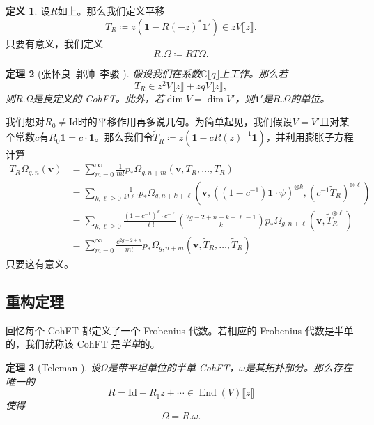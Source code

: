 \documentclass{amsart}
\newtheorem{thm}{定理}[section]
\theoremstyle{definition}
\newtheorem{defn}[thm]{定义}
\theoremstyle{remark}
\theoremstyle{plain}
\theoremstyle{definition}
\theoremstyle{remark}
\newcommand{\C}{\mathbb{C}}
\newcommand{\mbf}[1]{\mathbf{#1}}
\newcommand{\bv}{\mbf{v}}
\newcommand{\mr}[1]{\mathrm{#1}}
\newcommand{\1}{\mathbf{1}}
\newcommand{\2}{\mathbf{2}}
\newcommand{\3}{\mathbf{3}}
\newcommand{\ps}[1]{\llbracket #1 \rrbracket}
\DeclareMathOperator{\End}{End}
\begin{document}
\begin{defn}
    设$R$如上。那么我们定义平移
    \[ T_R \coloneqq z (\1 - R(-z)^* \1') \in z V\ps{z}. \]
    只要有意义，我们定义
    \[ R.\Omega \coloneqq RT\Omega. \]
\end{defn}

\begin{thm}[张怀良–郭帅–李骏 {\cite[定理~2.7]{CGL2026}}]
    假设我们在系数$\C\ps{q}$上工作。那么若
    \[ T_R \in z^2 V \ps{z} + zq V \ps{z}, \]
    则$R.\Omega$是良定义的 CohFT。此外，若$\dim V = \dim V'$，则$\1'$是$R.\Omega$的单位。
\end{thm}

我们想对$R_0 \neq \mr{Id}$时的平移作用再多说几句。为简单起见，我们假设$V = V'$且对某个常数$c$有$R_0 \1 = c \cdot \1$。那么我们令$\tilde{T}_R \coloneqq z( \1 - c R(z)^{-1} \1)$，并利用膨胀子方程计算
\begin{align*}
    T_R \Omega_{g,n}(\bv) &= \sum_{m=0}^{\infty} \frac{1}{m!} p_*\Omega_{g,n+m}(\bv, T_R, \ldots, T_R) \\
    &= \sum_{k,\ell \geq 0} \frac{1}{k!\ell!} p_* \Omega_{g,n+k+\ell}(\bv, ( (1-c^{-1})\1 \cdot \psi )^{\otimes k}, ( c^{-1} \tilde{T}_R )^{\otimes \ell}) \\
    &= \sum_{k,\ell \geq 0} \frac{(1-c^{-1})^k \cdot c^{-\ell}}{\ell!} \binom{2g-2+n+k+\ell-1}{k} p_* \Omega_{g,n+\ell}(\bv, \tilde{T}_R^{\otimes \ell}) \\
    &= \sum_{m=0}^{\infty} \frac{c^{2g-2+n}}{m!} p_* \Omega_{g,n+m}(\bv, \tilde{T}_R, \ldots, \tilde{T}_R)
\end{align*}
只要这有意义。


\subsection{重构定理}%
\label{sub:Reconstruction theorem}

回忆每个 CohFT 都定义了一个 Frobenius 代数。若相应的 Frobenius 代数是半单的，我们就称该 CohFT 是\textit{半单}的。

\begin{thm}[Teleman {\cite{Teleman2012}}]%
\label{thm:teleman}
    设$\Omega$是带平坦单位的半单 CohFT，$\omega$是其拓扑部分。那么存在唯一的
    \[ R = \mr{Id} + R_1 z + \cdots \in \End(V)\ps{z} \]
    使得
    \[ \Omega = R.\omega. \]
\end{thm}
\end{document}
